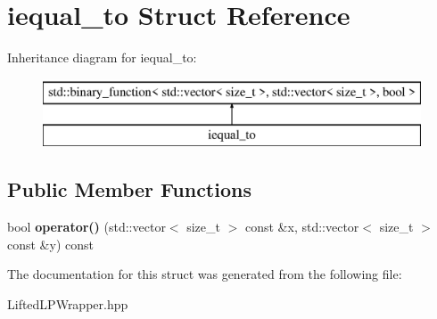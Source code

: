 \hypertarget{structiequal__to}{\section{iequal\-\_\-to Struct Reference}
\label{structiequal__to}
}
Inheritance diagram for iequal\-\_\-to\-:\begin{figure}[H]
\begin{center}
\leavevmode
\includegraphics[height=2.000000cm]{structiequal__to}
\end{center}
\end{figure}
\subsection*{Public Member Functions}
\begin{DoxyCompactItemize}
\item 
\hypertarget{structiequal__to_a30c517fd40309fbd7f76ed1abc625717}{bool {\bfseries operator()} (std\-::vector$<$ size\-\_\-t $>$ const \&x, std\-::vector$<$ size\-\_\-t $>$ const \&y) const }\label{structiequal__to_a30c517fd40309fbd7f76ed1abc625717}

\end{DoxyCompactItemize}


The documentation for this struct was generated from the following file\-:\begin{DoxyCompactItemize}
\item 
Lifted\-L\-P\-Wrapper.\-hpp\end{DoxyCompactItemize}
